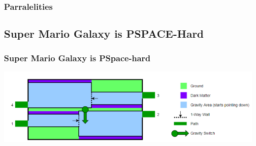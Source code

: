 \documentclass{beamer}
\begin{document}
\begin{frame}
  \frametitle{Parralelities}
\end{frame}

\subsection{Super Mario Galaxy is PSPACE-Hard}
\begin{frame}
  \frametitle{Super Mario Galaxy is PSpace-hard}
  \includegraphics[width=1\textwidth]{res/Super Mario Galaxy.png}
\end{frame}
\end{document}
